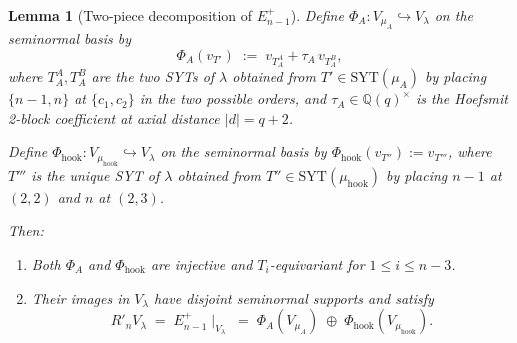 \documentclass[11pt]{article}
\newtheorem{lemma}[theorem]{Lemma}
\theoremstyle{definition}
\newcommand{\SYT}{\mathrm{SYT}}
\begin{document}
\begin{lemma}[Two-piece decomposition of $E_{n-1}^+$]\label{lem:Eplus-decomp}
Define $\Phi_A : V_{\mu_A} \hookrightarrow V_\lambda$ on the
seminormal basis by
\[
   \Phi_A(v_{T'}) \;:=\; v_{T_A^A} + \tau_A\,v_{T_A^B},
\]
where $T_A^A, T_A^B$ are the two SYTs of $\lambda$ obtained from $T'
\in \SYT(\mu_A)$ by placing $\{n-1, n\}$ at $\{c_1, c_2\}$ in the two
possible orders, and $\tau_A \in \mathbb{Q}(q)^\times$ is the Hoefsmit
2-block coefficient at axial distance $|d| = q+2$.

Define $\Phi_{\mathrm{hook}} : V_{\mu_{\mathrm{hook}}} \hookrightarrow
V_\lambda$ on the seminormal basis by $\Phi_{\mathrm{hook}}(v_{T''}) :=
v_{T'''}$, where $T'''$ is the unique SYT of $\lambda$ obtained from
$T'' \in \SYT(\mu_{\mathrm{hook}})$ by placing $n-1$ at $(2, 2)$ and
$n$ at $(2, 3)$.

Then:
\begin{enumerate}[topsep=0.3em,itemsep=0.1em,leftmargin=2em,
                  label=(\roman*)]
\item Both $\Phi_A$ and $\Phi_{\mathrm{hook}}$ are injective and
   $T_i$-equivariant for $1 \le i \le n - 3$.
\item Their images in $V_\lambda$ have disjoint seminormal supports
   and satisfy
   \[
       R'_n V_\lambda \;=\; E_{n-1}^+\!\mid_{V_\lambda}
       \;=\; \Phi_A(V_{\mu_A}) \;\oplus\; \Phi_{\mathrm{hook}}(V_{\mu_{\mathrm{hook}}}).
   \]
\end{enumerate}
\end{lemma}
\end{document}
